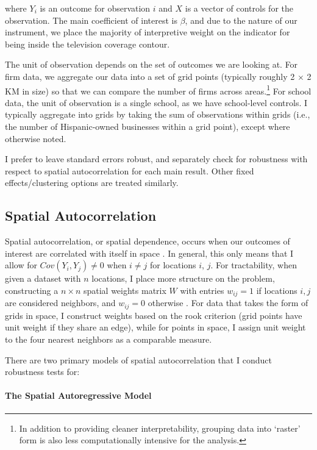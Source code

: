 \documentclass[11pt]{article}
\begin{document}
where $Y_i$ is an outcome for observation $i$ and $X$ is a vector of controls for the observation. The main coefficient of interest is $\beta$, and due to the nature of our instrument, we place the majority of interpretive weight on the indicator for being inside the television coverage contour. 

The unit of observation depends on the set of outcomes we are looking at. For firm data, we aggregate our data into a set of grid points (typically roughly 2 $\times$ 2 KM in size) so that we can compare the number of firms across areas.\footnote{ In addition to providing cleaner interpretability, grouping data into `raster' form is also less computationally intensive for the analysis.} For school data, the unit of observation is a single school, as we have school-level controls. I typically aggregate into grids by taking the sum of observations within grids (i.e., the number of Hispanic-owned businesses within a grid point), except where otherwise noted.

I prefer to leave standard errors robust, and separately check for robustness with respect to spatial autocorrelation for each main result. Other fixed effects/clustering options are treated similarly.

\subsection{Spatial Autocorrelation}

Spatial autocorrelation, or spatial dependence, occurs when our outcomes of interest are correlated with itself in space \citep{cliff_spatial_1973}. In general, this only means that I allow for $Cov(Y_i,Y_j) \neq 0$ when $i\neq j$ for locations $i$, $j$. For tractability, when given a dataset with $n$ locations, I place more structure on the problem, constructing a $n \times n$ spatial weights matrix $W$ with entries $w_{ij} = 1$ if locations $i,j$ are considered neighbors, and $w_{ij} = 0$ otherwise \citep{anselin_spatial_1998}. For data that takes the form of grids in space, I construct weights based on the rook criterion (grid points have unit weight if they share an edge), while for points in space, I assign unit weight to the four nearest neighbors as a comparable measure.

There are two primary models of spatial autocorrelation that I conduct robustness tests for:

\paragraph{The Spatial Autoregressive Model}
\end{document}
